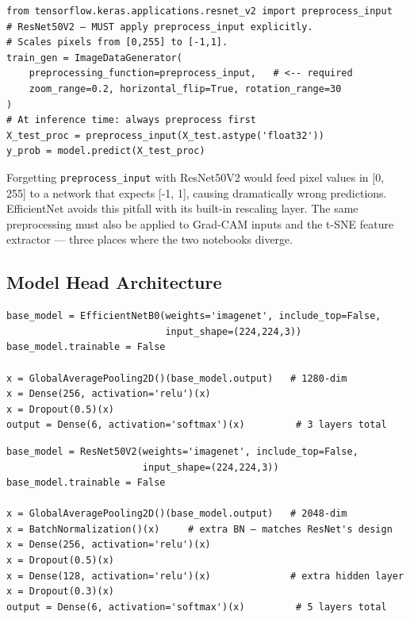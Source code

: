 \documentclass[12pt,a4paper]{article}
\begin{document}
\begin{tcolorbox}[resbox]
\begin{lstlisting}
from tensorflow.keras.applications.resnet_v2 import preprocess_input
# ResNet50V2 — MUST apply preprocess_input explicitly.
# Scales pixels from [0,255] to [-1,1].
train_gen = ImageDataGenerator(
    preprocessing_function=preprocess_input,   # <-- required
    zoom_range=0.2, horizontal_flip=True, rotation_range=30
)
# At inference time: always preprocess first
X_test_proc = preprocess_input(X_test.astype('float32'))
y_prob = model.predict(X_test_proc)
\end{lstlisting}
\end{tcolorbox}

\begin{tcolorbox}[findingbox, title=Why This Matters]
Forgetting \texttt{preprocess\_input} with ResNet50V2 would feed pixel values in
[0, 255] to a network that expects [-1, 1], causing dramatically wrong predictions.
EfficientNet avoids this pitfall with its built-in rescaling layer.
The same preprocessing must also be applied to Grad-CAM inputs and the
t-SNE feature extractor — three places where the two notebooks diverge.
\end{tcolorbox}

\subsection{Model Head Architecture}

\begin{tcolorbox}[efftbox]
\begin{lstlisting}
base_model = EfficientNetB0(weights='imagenet', include_top=False,
                            input_shape=(224,224,3))
base_model.trainable = False

x = GlobalAveragePooling2D()(base_model.output)   # 1280-dim
x = Dense(256, activation='relu')(x)
x = Dropout(0.5)(x)
output = Dense(6, activation='softmax')(x)         # 3 layers total
\end{lstlisting}
\end{tcolorbox}

\begin{tcolorbox}[resbox]
\begin{lstlisting}
base_model = ResNet50V2(weights='imagenet', include_top=False,
                        input_shape=(224,224,3))
base_model.trainable = False

x = GlobalAveragePooling2D()(base_model.output)   # 2048-dim
x = BatchNormalization()(x)     # extra BN — matches ResNet's design
x = Dense(256, activation='relu')(x)
x = Dropout(0.5)(x)
x = Dense(128, activation='relu')(x)              # extra hidden layer
x = Dropout(0.3)(x)
output = Dense(6, activation='softmax')(x)         # 5 layers total
\end{lstlisting}
\end{tcolorbox}
\end{document}

